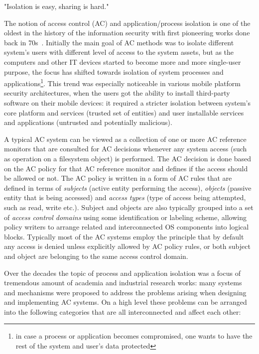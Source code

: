 \begin{quoting}
"Isolation is easy, sharing is hard."
\end{quoting}


The notion of access control (AC) and application/process isolation is one of the oldest in the history of the information security with first pioneering works done back in 70s~\cite{saltzer75, Denning76}. Initially the main goal of AC methods was to isolate different system's users with different level of access to the system assets, but as the computers and other IT devices started to become more and more single-user purpose, the focus has shifted towards isolation of system processes and applications\footnote{in case a process or application becomes compromised, one wants to have the rest of the system and user's data protected}.
 This trend was especially noticeable in various mobile platform security architectures, when the users got the ability to install third-party software on their mobile devices: it required a stricter isolation between system's core platform and services (trusted set of entities) and user installable services and applications (untrusted and potentially malicious).

A typical AC system can be viewed as a collection of one or more AC reference monitors that are consulted for AC decisions whenever any system access (such as operation on a filesystem object) is performed. The AC decision is done based on the AC policy for that AC reference monitor and defines if the access should be allowed or not. The AC policy is written in a form of AC rules that are defined in terms of \textit{subjects} (active entity performing the access), \textit{objects} (passive entity that is being accessed) and \textit{access types} (type of access being attempted, such as read, write etc.). Subject and objects are also typically grouped into a set of \textit{access control domains} using some identification or labeling scheme, allowing policy writers to arrange related and interconnected OS components into logical blocks. Typically most of the AC systems employ the principle that by default any access is denied unless explicitly allowed by AC policy rules, or both subject and object are belonging to the same access control domain.
 
Over the decades the topic of process and application isolation was a focus of tremendous amount of academia and industrial research works: many systems and mechanisms were proposed to address the problems arising when designing and implementing AC systems. On a high level these problems can be arranged into the following categories that are all interconnected and affect each other: 

